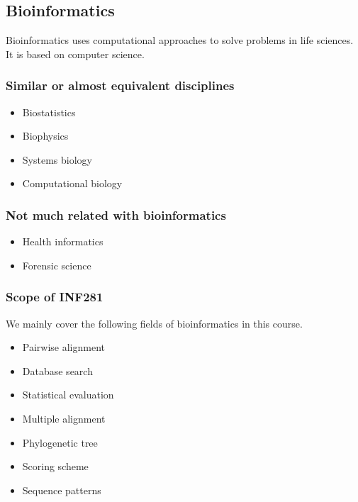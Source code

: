 %
%

%
%
\subsection{Bioinformatics}
Bioinformatics uses computational approaches to solve problems in life sciences. It is based on computer science.

%
%
\subsubsection*{Similar or almost equivalent disciplines}
\begin{itemize}
\item Biostatistics
\item Biophysics
\item Systems biology
\item Computational biology
\end{itemize}

%
%
\subsubsection*{Not much related with bioinformatics}
\begin{itemize}
\item Health informatics
\item Forensic science
\end{itemize}

%
%
\subsubsection*{Scope of INF281}
We mainly cover the following fields of bioinformatics in this course.
\begin{itemize}
\item Pairwise alignment
\item Database search
\item Statistical evaluation
\item Multiple alignment
\item Phylogenetic tree
\item Scoring scheme
\item Sequence patterns
\end{itemize}

